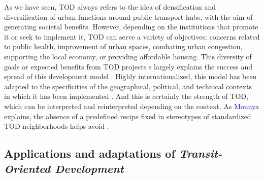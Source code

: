 \begin{refsegment}
As we have seen, \acrshort{TOD} always refers to the idea of densification and diversification of urban functions around public transport hubs, with the aim of generating societal benefits. However, depending on the institutions that promote it or seek to implement it, \acrshort{TOD} can serve a variety of objectives: concerns related to public health, improvement of urban spaces, combating urban congestion, supporting the local economy, or providing affordable housing. This diversity of goals or expected benefits from \acrshort{TOD} projects \textcolor{blue}{s} largely explains the success and spread of this development model \textcolor{blue}{\autocite[14]{bentayou_transit-oriented_2015}}. Highly internationalized, this model has been adapted to the specificities of the geographical, political, and technical contexts in which it has been implemented \textcolor{blue}{\autocites[1202]{thomas_is_2018}[181]{veloso_e_zarate_quartiers_2024}}. And this is certainly the strength of \acrshort{TOD}, which can be interpreted and reinterpreted depending on the context. As \textcolor{blue}{Mounya} \textcolor{blue}{\textcite[52]{el_hadeuf_ville_2017}} explains, the absence of a predefined recipe fixed in stereotypes of standardized \acrshort{TOD} neighborhoods helps avoid .%

\subsection{Applications and adaptations of \textsl{Transit-Oriented Development}
    \label{chap1:tod-presentation-generale-declinaisons}
    }


\end{refsegment}
